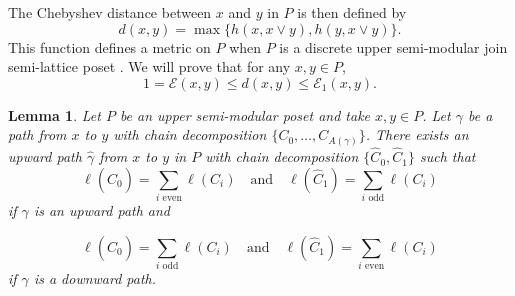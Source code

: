 \documentclass{article}[12pt]
\theoremstyle{exampstyle}
\newtheorem{lemma}[theorem]{Lemma}
\theoremstyle{remark}
\newcommand{\E}{\mathcal{E}}
\newcommand{\tuple}[3][1]{#2_{#1}, \dots , #2_{#3}}
\begin{document}
The Chebyshev distance between $x$ and $y$ in $P$ is then defined by \[d(x,y) = \max\{ h(x, x \vee y), h(y, x \vee y) \}.\] This function defines a metric on $P$ when $P$ is a discrete upper semi-modular join semi-lattice poset \cite{discrete_poset_distances}. We will prove that for any $x,y \in P$,
    \[1 = \E(x,y) \leq d(x,y) \leq \E_1(x,y). \]





\begin{lemma}
     Let $P$ be an upper semi-modular poset and take $x,y \in P$. Let $\gamma$ be a path from $x$ to $y$ with chain decomposition $\{ \tuple[0]{C}{A(\gamma)}\}$. There exists an upward path $\hat{\gamma}$ from $x$ to $y$ in $P$ with chain decomposition $\{\hat{C}_0, \hat{C}_1\}$ such that \[\ell(\hat{C} _0) = \sum\limits_{i \text{ even}} \ell(C_i) \quad \text{and} \quad \ell(\hat{C}_1) = \sum\limits_{i \text{ odd}} \ell(C_i)\]
     if $\gamma $ is an upward path and 

    \[\ell(\hat{C} _0) = \sum\limits_{i \text{ odd}} \ell(C_i) \quad \text{and} \quad \ell(\hat{C}_1) = \sum\limits_{i \text{ even}} \ell(C_i)\]
    if $\gamma $ is a downward path.
    \label{lemma:path_to_one_upward_path} 
\end{lemma}
\end{document}
